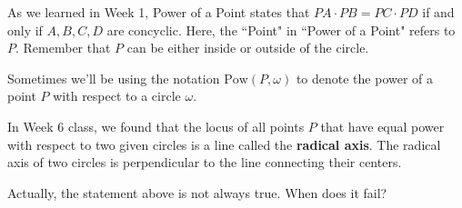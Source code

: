 









As we learned in Week 1, Power of a Point states that $PA\cdot PB = PC\cdot PD$ if and only if $A,B,C,D$ are concyclic. Here, the ``Point" in ``Power of a Point" refers to $P$. Remember that $P$ can be either inside or outside of the circle.

Sometimes we'll be using the notation $\text{Pow}(P, \omega)$ to denote the power of a point $P$ with respect to a circle $\omega$.

In Week 6 class, we found that the locus of all points $P$ that have equal power with respect to two given circles is a line called the \textbf{radical axis}. The radical axis of two circles is perpendicular to the line connecting their centers.

Actually, the statement above is not always true. When does it fail?




